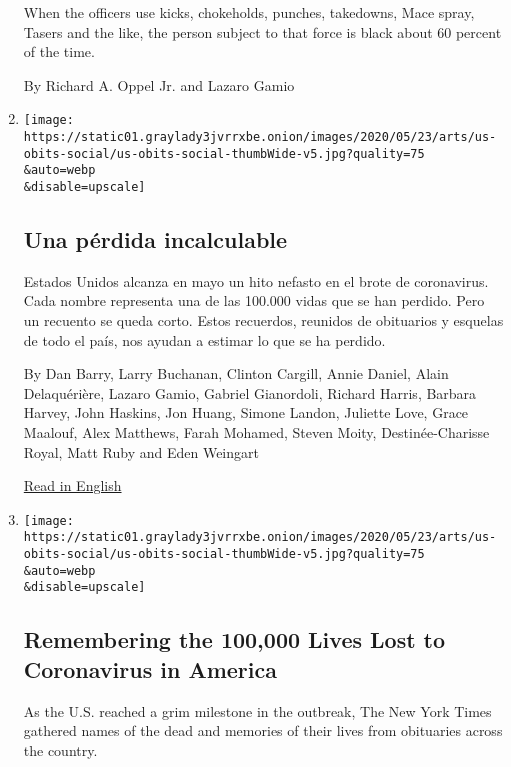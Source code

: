 \begin{enumerate}
  When the officers use kicks, chokeholds, punches, takedowns, Mace
  spray, Tasers and the like, the person subject to that force is black
  about 60 percent of the time.

  By Richard A. Oppel Jr. and Lazaro Gamio
\item
  \href{/es/2020/05/26/espanol/mundo/100000-victimas-covid-estados-unidos.html}{}

  \texttt{[image: https://static01.graylady3jvrrxbe.onion/images/2020/05/23/arts/us-obits-social/us-obits-social-thumbWide-v5.jpg?quality=75\\\&auto=webp\\\&disable=upscale]}

  \hypertarget{una-puxe9rdida-incalculable}{%
  \subsection{Una pérdida
  incalculable}\label{una-puxe9rdida-incalculable}}

  Estados Unidos alcanza en mayo un hito nefasto en el brote de
  coronavirus. Cada nombre representa una de las 100.000 vidas que se
  han perdido. Pero un recuento se queda corto. Estos recuerdos,
  reunidos de obituarios y esquelas de todo el país, nos ayudan a
  estimar lo que se ha perdido.

  By Dan Barry, Larry Buchanan, Clinton Cargill, Annie Daniel, Alain
  Delaquérière, Lazaro Gamio, Gabriel Gianordoli, Richard Harris,
  Barbara Harvey, John Haskins, Jon Huang, Simone Landon, Juliette Love,
  Grace Maalouf, Alex Matthews, Farah Mohamed, Steven Moity,
  Destinée-Charisse Royal, Matt Ruby and Eden Weingart

  \href{https://www.nytimes3xbfgragh.onion/interactive/2020/05/24/us/us-coronavirus-deaths-100000.html}{Read
  in English}
\item
  \href{/interactive/2020/05/24/us/us-coronavirus-deaths-100000.html}{}

  \texttt{[image: https://static01.graylady3jvrrxbe.onion/images/2020/05/23/arts/us-obits-social/us-obits-social-thumbWide-v5.jpg?quality=75\\\&auto=webp\\\&disable=upscale]}

  \hypertarget{remembering-the-100000-lives-lost-to-coronavirus-in-america}{%
  \subsection{Remembering the 100,000 Lives Lost to Coronavirus in
  America}\label{remembering-the-100000-lives-lost-to-coronavirus-in-america}}

  As the U.S. reached a grim milestone in the outbreak, The New York
  Times gathered names of the dead and memories of their lives from
  obituaries across the country.


\end{enumerate}

